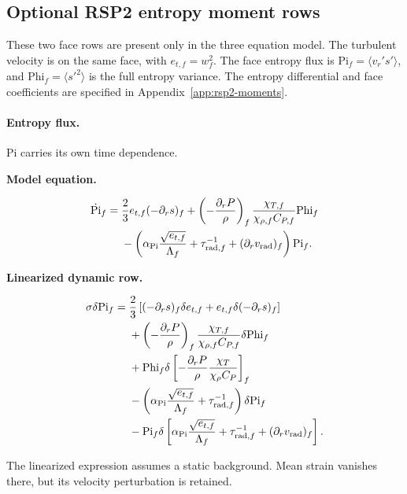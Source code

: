 \documentclass[11pt]{article}
\newenvironment{rowpair}[1]{%
  \def\rowcolor{#1}%
  \begin{tcolorbox}[colback=#1!3!white,colframe=#1,
    coltext=black,boxrule=0.4pt,leftrule=2pt,arc=0pt,
    left=7pt,right=7pt,top=5pt,bottom=3pt,
    before skip=7pt,after skip=7pt]
  \setlength{\abovedisplayskip}{6pt}%
  \setlength{\belowdisplayskip}{6pt}%
  \setlength{\abovedisplayshortskip}{4pt}%
  \setlength{\belowdisplayshortskip}{4pt}%
  \noindent\textbf{Model equation.}\par
}{\end{tcolorbox}\nopagebreak[4]}
\newenvironment{equationblock}{%
  \par\noindent\begin{minipage}{\linewidth}%
}{\end{minipage}\par\addvspace{12pt}}
\newenvironment{linearized}[1]{%
  \par\smallskip\begingroup\color{\rowcolor}%
  \noindent\textbf{Linearized #1.}\par
}{\endgroup}
\begin{document}
\subsection{Optional RSP2 entropy moment rows}
\label{sec:rsp2-moment-rows}

These two face rows are present only in the three equation model.
The turbulent velocity is on the same face, with $e_{t,f}=w_f^2$. The face entropy flux is
$\mathrm{Pi}_f=\langle v_r's'\rangle$, and $\mathrm{Phi}_f=\langle s'^2\rangle$
is the full entropy variance. The entropy differential and face coefficients
are specified in Appendix~\ref{app:rsp2-moments}.

\begin{equationblock}
\paragraph{Entropy flux.} Pi carries its own time dependence.
\begin{rowpair}{LnaDynamic}
\begin{equation}
\begin{aligned}
 \dot{\mathrm{Pi}}_f={}&\frac23e_{t,f}(-\partial_r s)_f
 +\left(-\frac{\partial_r P}{\rho}\right)_f
       \frac{\chi_{T,f}}{\chi_{\rho,f}C_{P,f}}\mathrm{Phi}_f\\
 &-\left(\alpha_{\mathrm{Pi}}\frac{\sqrt{e_{t,f}}}{\Lambda_f}
       +\tau_{{\rm rad},f}^{-1}+ (\partial_r v_{\rm rad})_f\right)\mathrm{Pi}_f .
\end{aligned}
\end{equation}
\begin{linearized}{dynamic row}
\begin{equation}
\begin{aligned}
 \sigma\delta\mathrm{Pi}_f={}&\frac23\left[
     (-\partial_r s)_f\delta e_{t,f}+e_{t,f}\delta(-\partial_r s)_f\right]\\
 &+\left(-\frac{\partial_r P}{\rho}\right)_f
       \frac{\chi_{T,f}}{\chi_{\rho,f}C_{P,f}}\delta\mathrm{Phi}_f\\
 &+\mathrm{Phi}_f\delta\left[
       -\frac{\partial_r P}{\rho}\frac{\chi_T}{\chi_\rho C_P}\right]_f\\
 &-\left(\alpha_{\mathrm{Pi}}\frac{\sqrt{e_{t,f}}}{\Lambda_f}
       +\tau_{{\rm rad},f}^{-1}\right)\delta\mathrm{Pi}_f\\
 &-\mathrm{Pi}_f\delta\left[
       \alpha_{\mathrm{Pi}}\frac{\sqrt{e_{t,f}}}{\Lambda_f}
       +\tau_{{\rm rad},f}^{-1}+ (\partial_r v_{\rm rad})_f\right].
\end{aligned}
\end{equation}
\end{linearized}
\end{rowpair}
The linearized expression assumes a static background. Mean strain vanishes
there, but its velocity perturbation is retained.
\end{equationblock}
\end{document}

